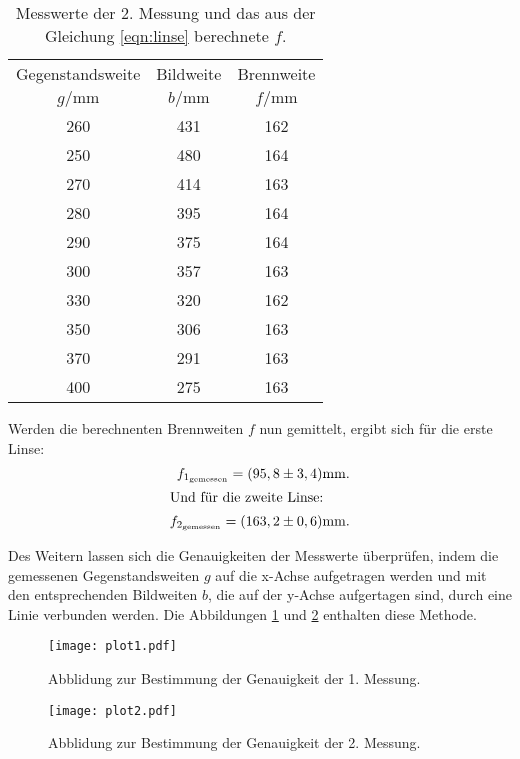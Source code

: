 \FloatBarrier
\begin{table}
  \centering
  \caption{Messwerte der 2. Messung und das aus der Gleichung
   \eqref{eqn:linse} berechnete $f$.}
  \label{tab:2}
  \begin{tabular}{c c c}
  \toprule
  Gegenstandsweite   & Bildweite & Brennweite\\
  $g/\si{\milli\meter}$ & $b/\si{\milli\meter}$ & $f/\si{\milli\meter}$\\
  \midrule
  260  &  431 & 162\\
  250  &  480 & 164\\
  270  &  414 & 163\\
  280  &  395 & 164\\
  290  &  375 & 164\\
  300  &  357 & 163\\
  330  &  320 & 162\\
  350  &  306 & 163\\
  370  &  291 & 163\\
  400  &  275 & 163\\
  \bottomrule
\end{tabular}
\end{table}
\FloatBarrier
Werden die berechnenten Brennweiten $f$
nun gemittelt, ergibt sich für die erste Linse:
\begin{align*}
  f_{1_\mathrm{gemessen}}=(95,8\pm3,4)\si{\milli\meter}.\\
\intertext{Und für die zweite Linse:}
f_{2_\mathrm{gemessen}}=(163,2\pm0,6)\si{\milli\meter}.
\end{align*}

Des Weitern lassen sich die Genauigkeiten der Messwerte überprüfen,
indem die gemessenen Gegenstandsweiten $g$ auf die x-Achse aufgetragen werden
und mit den entsprechenden Bildweiten $b$, die auf der y-Achse aufgertagen sind,
durch eine Linie verbunden werden. Die Abbildungen \ref{fig:1} und \ref{fig:2}
enthalten diese Methode.

\begin{figure}
 \centering
 \texttt{[image: plot1.pdf]}
 \caption{Abblidung zur Bestimmung der Genauigkeit der 1. Messung.}
 \label{fig:1}
\end{figure}
\FloatBarrier
\begin{figure}
 \centering
 \texttt{[image: plot2.pdf]}
 \caption{Abblidung zur Bestimmung der Genauigkeit der 2. Messung.}
 \label{fig:2}
\end{figure}
\FloatBarrier
